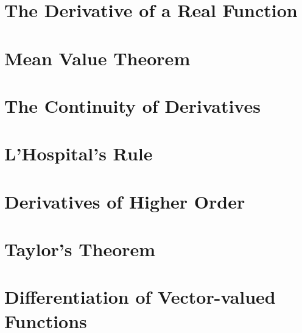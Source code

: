 
\section{The Derivative of a Real Function}\label{sec:the-derivative-of-a-real-function}


\section{Mean Value Theorem}\label{sec:mean-value-theorem}


\section{The Continuity of Derivatives}\label{sec:the-continuity-of-derivatives}


\section{L'Hospital's Rule}\label{sec:lhospitals-rule}


\section{Derivatives of Higher Order}\label{sec:derivatives-of-higher-order}


\section{Taylor's Theorem}\label{sec:taylors-theorem}


\section{Differentiation of Vector-valued Functions}\label{sec:differentiation-of-vector-valued-functions}


